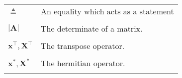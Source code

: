 \begin{longtable}{lp{}}
    $\triangleq$                                                                                               & An equality which acts as a statement                                                                                                                                                                                                                                                                                                                                                                                                                                                                                                                                                                                                                                                                                                                                                                                                                                                                                                             \\\\
    $\left| \bm{A} \right|$                                                                                    & The determinate of a matrix.                                                                                                                                                                                                                                                                                                                                                                                                                                                                                                                                                                                                                                                                                                                                                                                                                                                                                                                      \\\\
    $\bm{x}^{\intercal}, \bm{X}^{\intercal}$                                                                   & The transpose operator.
    \\\\
    $\bm{x}^{\ast}, \bm{X}^{\ast}$                                                                             & The hermitian operator.
    \\\\

\end{longtable}
